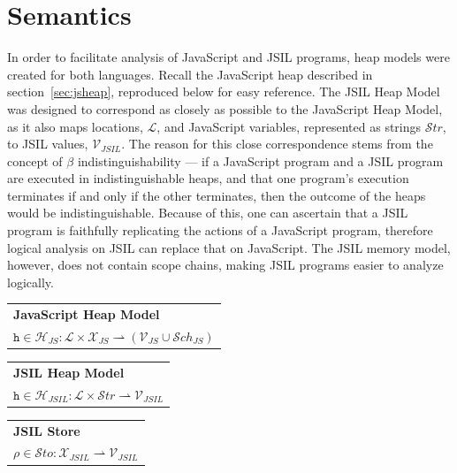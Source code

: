 \documentclass[a4paper,11pt,twoside]{report}
\begin{document}
\section{Semantics}
In order to facilitate analysis of JavaScript and JSIL programs, heap models were created for both languages. Recall the JavaScript heap described in section~\ref{sec:jsheap}, reproduced below for easy reference. The JSIL Heap Model was designed to correspond as closely as possible to the JavaScript Heap Model, as it also maps locations, $\mathcal{L}$, and JavaScript variables, represented as strings $\mathcal{S}tr$, to JSIL values, $\mathcal{V}_{JSIL}$. The reason for this close correspondence stems from the concept of $\beta$ indistinguishability --- if a JavaScript program and a JSIL program are executed in indistinguishable heaps, and that one program's execution terminates if and only if the other terminates, then the outcome of the heaps would be indistinguishable. Because of this, one can ascertain that a JSIL program is faithfully replicating the actions of a JavaScript program, therefore logical analysis on JSIL can replace that on JavaScript. The JSIL memory model, however, does not contain scope chains, making JSIL programs easier to analyze logically.

\begin{center}
\begin{tabular}{p{8cm}} \hline
\textbf{JavaScript Heap Model} \\
$\texttt{h} \in \mathcal{H}_{JS} : \mathcal{L} \times \mathcal{X}_{JS} \rightharpoonup (\mathcal{V}_{JS} \cup \mathcal{S}ch_{JS})$  \\ \hline
\end{tabular}

\vspace{0.3cm}
\begin{tabular}{p{8cm}} \hline
\textbf{JSIL Heap Model} \\
$\texttt{h} \in \mathcal{H}_{JSIL} : \mathcal{L} \times \mathcal{S}tr \rightharpoonup \mathcal{V}_{JSIL}  $  \\ \hline
\end{tabular}

\vspace{0.3cm}
\begin{tabular}{p{8cm}} \hline
\textbf{JSIL Store} \\
$\rho \in \mathcal{S}to : \mathcal{X}_{JSIL} \rightharpoonup \mathcal{V}_{JSIL}  $  \\ \hline
\end{tabular}
\end{center}
\end{document}
